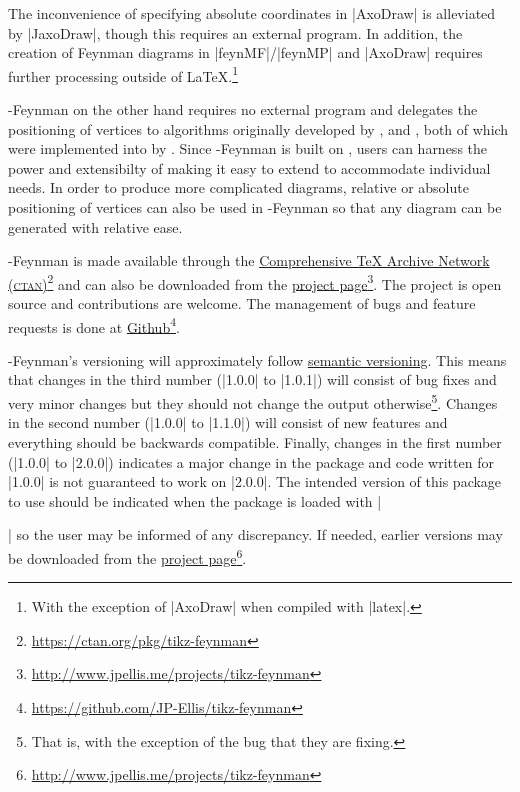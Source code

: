 \documentclass[a4paper,final]{ltxdoc}
\providecommand{\tikzfeynmanname}{\tikzname-Feynman}
\begin{document}
The inconvenience of specifying absolute coordinates in |AxoDraw| is alleviated by |JaxoDraw|, though this requires an external program.  In addition, the creation of Feynman diagrams in |feynMF|/|feynMP| and |AxoDraw| requires further processing outside of \LaTeX{}.\footnote{With the exception of |AxoDraw| when compiled with |latex|.}

\tikzfeynmanname{} on the other hand requires no external program and delegates the positioning of vertices to algorithms originally developed by \citeauthor{hu2005} \cite{hu2005}, and \citeauthor{eades1991} \cite{eades1991}, both of which were implemented into \tikzname{} by \citeauthor{pohlmann2011} \cite{pohlmann2011}.  Since \tikzfeynmanname{} is built on \tikzname{}, users can harness the power and extensibilty of \tikzname{} \cite{tikz} making it easy to extend to accommodate individual needs.  In order to produce more complicated diagrams, relative or absolute positioning of vertices can also be used in \tikzfeynmanname{} so that any diagram can be generated with relative ease.

\tikzfeynmanname{} is made available through the
\href{https://ctan.org/pkg/tikz-feynman}{Comprehensive \TeX{} Archive Network (\textsc{ctan})}\footnote{\url{https://ctan.org/pkg/tikz-feynman}} and can also be downloaded from the \href{http://www.jpellis.me/projects/tikz-feynman}{project page}\footnote{\url{http://www.jpellis.me/projects/tikz-feynman}}.  The project is open source and contributions are welcome.  The management of bugs and feature requests is done at \href{https://github.com/JP-Ellis/tikz-feynman}{Github}\footnote{\url{https://github.com/JP-Ellis/tikz-feynman}}.

\tikzfeynmanname{}'s versioning will approximately follow \href{http://semver.org}{semantic versioning}.  This means that changes in the third number (|1.0.0| to |1.0.1|) will consist of bug fixes and very minor changes but they should not change the output otherwise\footnote{That is, with the exception of the bug that they are fixing.}.  Changes in the second number (|1.0.0| to |1.1.0|) will consist of new features and everything should be backwards compatible.  Finally, changes in the first number (|1.0.0| to |2.0.0|) indicates a major change in the package and code written for |1.0.0| is not guaranteed to work on |2.0.0|.  The intended version of this package to use should be indicated when the package is loaded with |\usepackage[compat=x.y.z]{tikz-feynman}| so the user may be informed of any discrepancy.  If needed, earlier versions may be downloaded from the \href{http://www.jpellis.me/projects/tikz-feynman}{project page}\footnote{\url{http://www.jpellis.me/projects/tikz-feynman}}.
\end{document}
